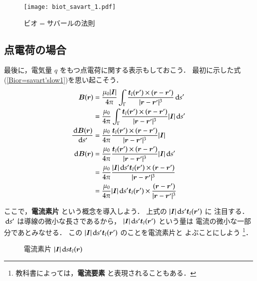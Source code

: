             \begin{figure}[hbt]
                \begin{center}
                    \texttt{[image: biot\_savart\_1.pdf]}
                    \caption{ビオ$=$サバールの法則}
                    \label{fig:biot_savart_1}
                \end{center}
            \end{figure}

    \subsection{点電荷の場合}
    最後に，電気量 $q$ をもつ点電荷に関する表示もしておこう．
    最初に示した式(\ref{Bior=savart'slow1})を思い起こそう．
        \begin{align*}
            \boldsymbol{B}(\boldsymbol{r})
            &=\frac{\mu_{0}|\boldsymbol{I}|}{4\pi}
             \int_{\Gamma}\frac{\boldsymbol{t}_{I}(\boldsymbol{r}')\times
                     (\boldsymbol{r}-\boldsymbol{r}')
                   }{|\boldsymbol{r}-\boldsymbol{r}'|^{3}}\,\mathrm{d} s' \\
            &=\frac{\mu_{0}}{4\pi}
             \int_{\Gamma}\frac{\boldsymbol{t}_{I}(\boldsymbol{r}')\times
                     (\boldsymbol{r}-\boldsymbol{r}')
                    }{|\boldsymbol{r}-\boldsymbol{r}'|^{3}}|\boldsymbol{I}|\,\mathrm{d} s'  \\
            \frac{\,\mathrm{d} \boldsymbol{B}(\boldsymbol{r})}{\,\mathrm{d} s'}
            &=\frac{\mu_{0}}{4\pi}
             \frac{\boldsymbol{t}_{I}(\boldsymbol{r}')\times
                     (\boldsymbol{r}-\boldsymbol{r}')
                    }{|\boldsymbol{r}-\boldsymbol{r}'|^{3}}|\boldsymbol{I}|  \\
            \,\mathrm{d} \boldsymbol{B}(\boldsymbol{r})
            &=\frac{\mu_{0}}{4\pi}
             \frac{\boldsymbol{t}_{I}(\boldsymbol{r}')\times
                     (\boldsymbol{r}-\boldsymbol{r}')
                    }{|\boldsymbol{r}-\boldsymbol{r}'|^{3}}|\boldsymbol{I}| \,\mathrm{d} s'  \\
            &=\frac{\mu_{0}}{4\pi}
             \frac{|\boldsymbol{I}|\,\mathrm{d} s' \boldsymbol{t}_{I}(\boldsymbol{r}')\times
                     (\boldsymbol{r}-\boldsymbol{r}')
                    }{|\boldsymbol{r}-\boldsymbol{r}'|^{3}}   \\
            &=\frac{\mu_{0}}{4\pi}|\boldsymbol{I}|\,\mathrm{d} s' \boldsymbol{t}_{I}(\boldsymbol{r}')\times
             \frac{(\boldsymbol{r}-\boldsymbol{r}')}{|\boldsymbol{r}-\boldsymbol{r}'|^{3}}
        \end{align*}

        ここで，\textbf{電流素片} という概念を導入しよう．
        上式の $|\boldsymbol{I}|\,\mathrm{d} s' \boldsymbol{t}_{I}(\boldsymbol{r}')$ に
        注目する．$\,\mathrm{d} s'$ は導線の微小な長さであるから，
        $|\boldsymbol{I}|\,\mathrm{d} s' \boldsymbol{t}_{I}(\boldsymbol{r}')$ という量は
        電流の微小な一部分であとみなせる．
        この $|\boldsymbol{I}|\,\mathrm{d} s' \boldsymbol{t}_{I}(\boldsymbol{r}')$ のことを電流素片と
        よぶことにしよう
            \footnote{
                教科書によっては，\textbf{電流要素} と表現されることもある．
            }．
        \begin{figure}[hbt]
            \begin{center}
                \caption{電流素片 $|\boldsymbol{I}|\,\mathrm{d} s \boldsymbol{t}_{I}(\boldsymbol{r})$}
                \label{fig:dennryu_sohenn}
            \end{center}
        \end{figure}


